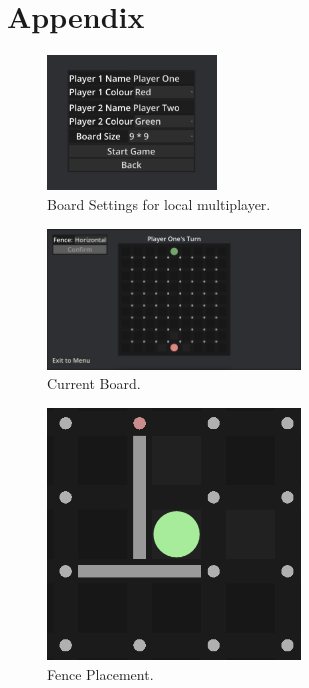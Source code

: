 \documentclass[progress]{cmpreport}
\begin{document}
\section{Appendix}
\begin{figure}[h]
    \centering
    \includegraphics[width=0.4\textwidth]{images/board_options.png}
    \caption{Board Settings for local multiplayer.}
    \label{fig:options}
\end{figure}
\begin{figure}[h]
    \centering
    \includegraphics[width=0.6\textwidth]{images/current_board.png}
    \caption{Current Board.}
    \label{fig:board}
\end{figure}
\begin{figure}[h]
    \centering
    \includegraphics[width=0.6\textwidth]{images/fence_placement.png}
    \caption{Fence Placement.}
    \label{fig:fence_placement}
\end{figure}
\end{document}
